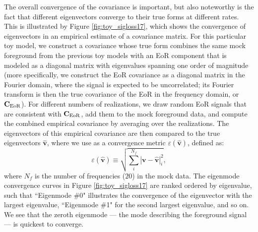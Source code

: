 \documentclass[preprint2,numberedappendix,tighten]{aastex6}  %
\begin{document}
The overall convergence of the covariance is important, but also noteworthy is the fact that different eigenvectors converge to their true forms at different rates. This is illustrated by Figure \ref{fig:toy_sigloss17}, which shows the convergence of eigenvectors in an empirical estimate of a covariance matrix. For this particular toy model, we construct a covariance whose true form combines the same mock foreground from the previous toy models with an EoR component that is modeled as a diagonal matrix with eigenvalues spanning one order of magnitude (more specifically, we construct the EoR covariance as a diagonal matrix in the Fourier domain, where the signal is expected to be uncorrelated; its Fourier transform is then the true covariance of the EoR in the frequency domain, or $\textbf{C}_{\rm EoR}$). For different numbers of realizations, we draw random EoR signals that are consistent with $\textbf{C}_{\rm EoR}$, add them to the mock foreground data, and compute the combined empirical covariance by averaging over the realizations. The eigenvectors of this empirical covariance are then compared to the true eigenvectors $\widehat{\textbf{v}}$, where we use as a convergence metric $\varepsilon(\widehat{\textbf{v}})$, defined as:
\begin{equation}
\label{eq:converge_eig}
\varepsilon (\widehat{\textbf{v}}) \equiv \sqrt{\sum_{i}^{N_{f}}|\textbf{v}-\widehat{\textbf{v}}|_{i}^2},
\end{equation}
where $N_{f}$ is the number of frequencies ($20$) in the mock data. The eigenmode convergence curves in Figure \ref{fig:toy_sigloss17} are ranked ordered by eigenvalue, such that ``Eigenmode \#0" illustrates the convergence of the eigenvector with the largest eigenvalue, ``Eigenmode \#1" for the second largest eigenvalue, and so on. We see that the zeroth eigenmode --- the mode describing the foreground signal --- is quickest to converge.
\end{document}
